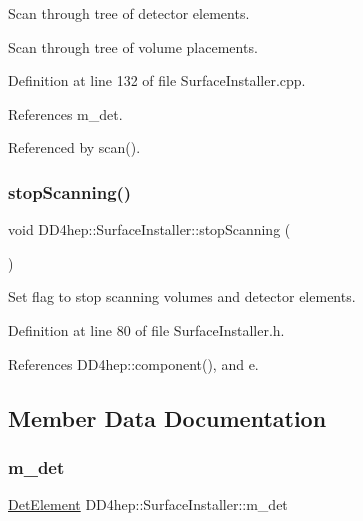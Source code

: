 Scan through tree of detector elements. 

Scan through tree of volume placements. 

Definition at line 132 of file Surface\+Installer.\+cpp.



References m\+\_\+det.



Referenced by scan().

\hypertarget{class_d_d4hep_1_1_surface_installer_a57fe4482c0759fc874a4248c0f4d89d8}{}\label{class_d_d4hep_1_1_surface_installer_a57fe4482c0759fc874a4248c0f4d89d8} 
\subsubsection{\texorpdfstring{stop\+Scanning()}{stopScanning()}}
{\footnotesize\ttfamily void D\+D4hep\+::\+Surface\+Installer\+::stop\+Scanning (\begin{DoxyParamCaption}{ }\end{DoxyParamCaption})\hspace{0.3cm}{\ttfamily [inline]}}



Set flag to stop scanning volumes and detector elements. 



Definition at line 80 of file Surface\+Installer.\+h.



References D\+D4hep\+::component(), and e.



\subsection{Member Data Documentation}
\hypertarget{class_d_d4hep_1_1_surface_installer_a8a8f3acac5b96cd94464d886e06bf6df}{}\label{class_d_d4hep_1_1_surface_installer_a8a8f3acac5b96cd94464d886e06bf6df} 
\subsubsection{\texorpdfstring{m\+\_\+det}{m\_det}}
{\footnotesize\ttfamily \hyperlink{class_d_d4hep_1_1_surface_installer_ab88f41bd9efd54b4b67baee892bfa926}{Det\+Element} D\+D4hep\+::\+Surface\+Installer\+::m\+\_\+det\hspace{0.3cm}{\ttfamily [protected]}}



